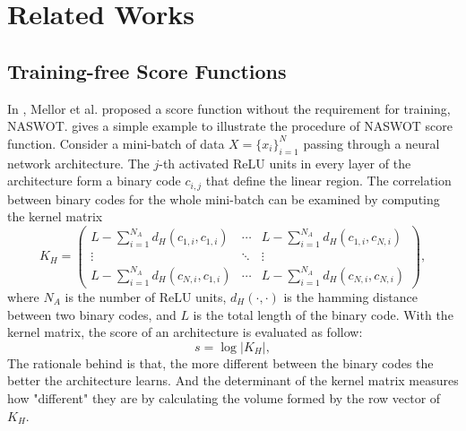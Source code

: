 \documentclass[sigconf]{acmart}
\begin{document}
    \section{Related Works}
    \label{sec:related_work}
    \subsection{Training-free Score Functions}
    In \cite{https://doi.org/10.48550/arxiv.2006.04647}, Mellor et al. 
    proposed a score function without the requirement for training, NASWOT. 
     gives a simple example 
    to illustrate the procedure of NASWOT score function. Consider a 
    mini-batch of data $X=\{x_i\}^N_{i=1}$ passing through a neural network 
    architecture. The $j$-th activated ReLU units in every layer of the architecture 
    form a binary code $c_{i,j}$ that define the linear region. The correlation 
    between binary codes for the whole mini-batch can be examined by computing 
    the kernel matrix 
    \begin{equation}
        K_H=\begin{pmatrix}L-\sum_{i=1}^{N_A}d_H(c_{1,i},c_{1,i})&\cdots&L-\sum_{i=1}^{N_A}d_H(c_{1,i},c_{N,i})\\\vdots&\ddots&\vdots\\L-\sum_{i=1}^{N_A}d_H(c_{N,i},c_{1,i})&\cdots&L-\sum_{i=1}^{N_A}d_H(c_{N,i},c_{N,i})\end{pmatrix},
    \end{equation}
    where $N_A$ is the number of ReLU units, $d_H(\cdot,\cdot)$ is the hamming 
    distance between two binary codes, and $L$ is the total length of the binary 
    code. With the kernel matrix, the score of an architecture is evaluated as 
    follow: 
    \begin{equation}
        s=\log\lvert K_H\rvert,
    \end{equation}
    The rationale behind is that, the more different between the binary codes 
    the better the architecture learns. And the determinant of the kernel matrix 
    measures how "different" they are by calculating the volume formed by the 
    row vector of $K_H$. 
\end{document}
